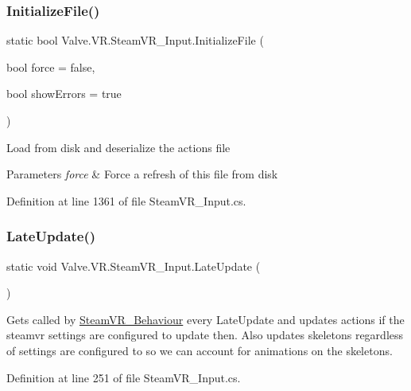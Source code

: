 \subsubsection{\texorpdfstring{InitializeFile()}{InitializeFile()}}
{\footnotesize\ttfamily static bool Valve.\+V\+R.\+Steam\+V\+R\+\_\+\+Input.\+Initialize\+File (\begin{DoxyParamCaption}\item[{bool}]{force = {\ttfamily false},  }\item[{bool}]{show\+Errors = {\ttfamily true} }\end{DoxyParamCaption})\hspace{0.3cm}{\ttfamily [static]}}



Load from disk and deserialize the actions file 


\begin{DoxyParams}{Parameters}
{\em force} & Force a refresh of this file from disk\\
\hline
\end{DoxyParams}


Definition at line 1361 of file Steam\+V\+R\+\_\+\+Input.\+cs.

\mbox{\label{class_valve_1_1_v_r_1_1_steam_v_r___input_a1a82a3a13e2455a0b4bde911d01fb4ef}} 
\subsubsection{\texorpdfstring{LateUpdate()}{LateUpdate()}}
{\footnotesize\ttfamily static void Valve.\+V\+R.\+Steam\+V\+R\+\_\+\+Input.\+Late\+Update (\begin{DoxyParamCaption}{ }\end{DoxyParamCaption})\hspace{0.3cm}{\ttfamily [static]}}



Gets called by \mbox{\hyperlink{class_valve_1_1_v_r_1_1_steam_v_r___behaviour}{Steam\+V\+R\+\_\+\+Behaviour}} every Late\+Update and updates actions if the steamvr settings are configured to update then. Also updates skeletons regardless of settings are configured to so we can account for animations on the skeletons. 



Definition at line 251 of file Steam\+V\+R\+\_\+\+Input.\+cs.

